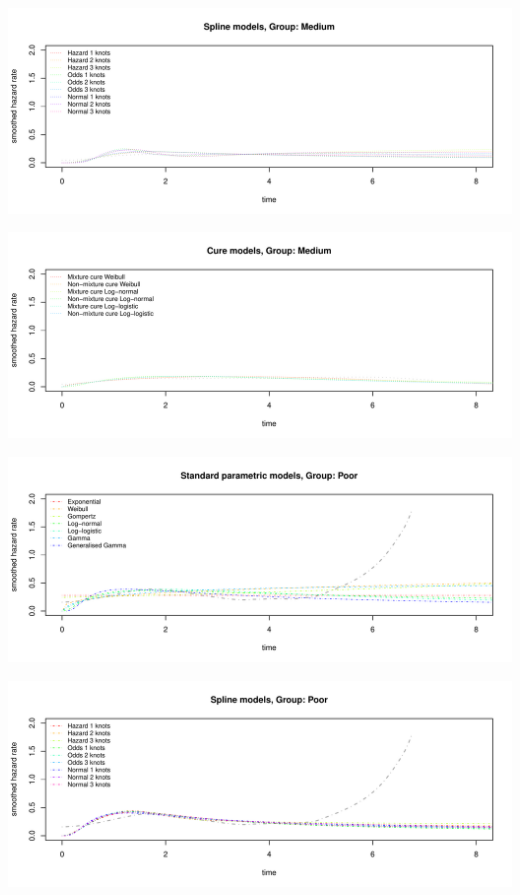 \documentclass[
]{article}
\begin{document}
\begin{flushleft}\includegraphics[height=0.29\textheight]{BC_OS_output/Images/Figure_plot_haz_pred-5} \end{flushleft}

\begin{flushleft}\includegraphics[height=0.29\textheight]{BC_OS_output/Images/Figure_plot_haz_pred-6} \end{flushleft}

\begin{flushleft}\includegraphics[height=0.29\textheight]{BC_OS_output/Images/Figure_plot_haz_pred-7} \end{flushleft}

\begin{flushleft}\includegraphics[height=0.29\textheight]{BC_OS_output/Images/Figure_plot_haz_pred-8} \end{flushleft}
\end{document}
